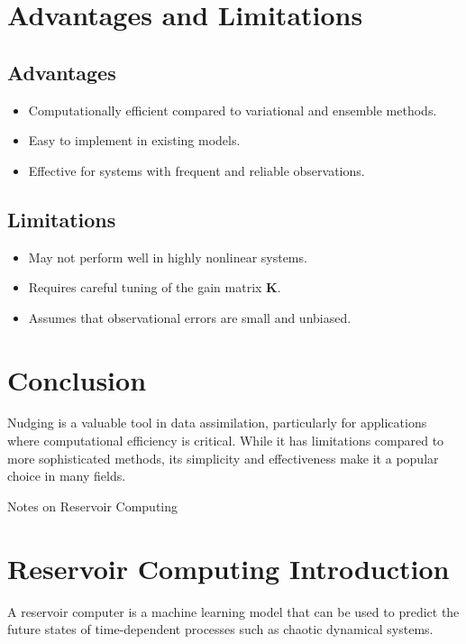 \documentclass[12pt,oneside]{article}
\theoremstyle{plain}
\begin{document}
\section{Advantages and Limitations}
\subsection{Advantages}
\begin{itemize}
    \item Computationally efficient compared to variational and ensemble methods.
    \item Easy to implement in existing models.
    \item Effective for systems with frequent and reliable observations.
\end{itemize}

\subsection{Limitations}
\begin{itemize}
    \item May not perform well in highly nonlinear systems.
    \item Requires careful tuning of the gain matrix \( \mathbf{K} \).
    \item Assumes that observational errors are small and unbiased.
\end{itemize}

\section{Conclusion}
Nudging is a valuable tool in data assimilation, particularly for applications where computational efficiency is critical. While it has limitations compared to more sophisticated methods, its simplicity and effectiveness make it a popular choice in many fields.

\pagebreak


\begin{center}
    \LARGE Notes on Reservoir Computing \\
\end{center}

\section{Reservoir Computing Introduction}
A reservoir computer is a machine learning model that can be used to predict the future states of time-dependent processes such as chaotic dynamical systems.
\end{document}
